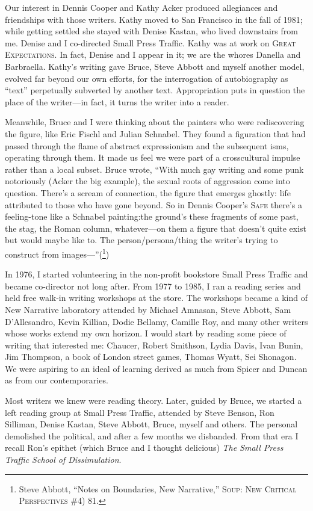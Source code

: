 \documentclass[
]{memoir}
\begin{document}
Our interest in Dennis Cooper and Kathy Acker produced allegiances and
friendships with those writers. Kathy moved to San Francisco in the fall
of 1981; while getting settled she stayed with Denise Kastan, who lived
downstairs from me. Denise and I co-directed Small Press Traffic. Kathy
was at work on \textsc{Great Expectations}. In fact, Denise and I appear
in it; we are the whores Danella and Barbraella. Kathy's writing gave
Bruce, Steve Abbott and myself another model, evolved far beyond our own
efforts, for the interrogation of autobiography as ``text'' perpetually
subverted by another text. Appropriation puts in question the place of
the writer---in fact, it turns the writer into a reader.

Meanwhile, Bruce and I were thinking about the painters who were
rediscovering the figure, like Eric Fischl and Julian Schnabel. They
found a figuration that had passed through the flame of abstract
expressionism and the subsequent isms, operating through them. It made
us feel we were part of a crosscultural impulse rather than a local
subset. Bruce wrote, ``With much gay writing and some punk notoriously
(Acker the big example), the sexual roots of aggression come into
question. There's a scream of connection, the figure that emerges
ghostly: life attributed to those who have gone beyond. So in Dennis
Cooper's \textsc{Safe} there's a feeling-tone like a Schnabel
painting:the ground's these fragments of some past, the stag, the Roman
column, whatever---on them a figure that doesn't quite exist but would
maybe like to. The person/persona/thing the writer's trying to construct
from images---''(\footnote{Steve Abbott, ``Notes on Boundaries, New
  Narrative,'' \textsc{Soup: New Critical Perspectives} \#4) 81.})

In 1976, I started volunteering in the non-profit bookstore Small Press
Traffic and became co-director not long after. From 1977 to 1985, I ran
a reading series and held free walk-in writing workshops at the store.
The workshops became a kind of New Narrative laboratory attended by
Michael Amnasan, Steve Abbott, Sam D'Allesandro, Kevin Killian, Dodie
Bellamy, Camille Roy, and many other writers whose works extend my own
horizon. I would start by reading some piece of writing that interested
me: Chaucer, Robert Smithson, Lydia Davis, Ivan Bunin, Jim Thompson, a
book of London street games, Thomas Wyatt, Sei Shonagon. We were
aspiring to an ideal of learning derived as much from Spicer and Duncan
as from our contemporaries.

Most writers we knew were reading theory. Later, guided by Bruce, we
started a left reading group at Small Press Traffic, attended by Steve
Benson, Ron Silliman, Denise Kastan, Steve Abbott, Bruce, myself and
others. The personal demolished the political, and after a few months we
disbanded. From that era I recall Ron's epithet (which Bruce and I
thought delicious) \emph{The Small Press Traffic School of
Dissimulation}.
\end{document}

